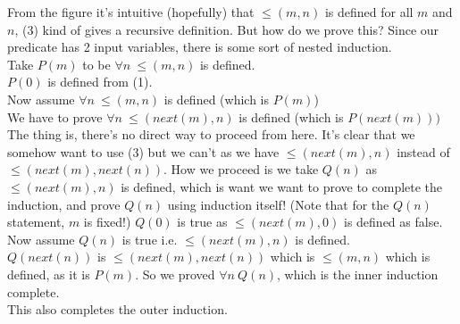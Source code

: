 \documentclass[a4paper,10pt]{article}
\theoremstyle{definition} %
\begin{document}
    From the figure it's intuitive (hopefully) that $\leq(m,n)$ is defined for all $m$ and $n$,
    (3) kind of gives a recursive definition. 
    But how do we prove this? Since our predicate has 2 input variables, there
    is some sort of nested induction.\\
    Take $P(m)$ to be $\forall n \ \leq(m,n)$ is defined. \\
    $P(0)$ is defined from (1).\\
    Now assume $\forall n \ \leq(m,n)$ is defined (which is $P(m)$) \\
    We have to prove $\forall n \ \leq(next(m),n)$ is defined (which is $P(next(m)))$ \\
    The thing is, there's no direct way to proceed from here. It's clear that we somehow
    want to use (3) but we can't as we have $\leq(next(m),n)$ instead of $\leq(next(m),next(n))$.
    How we proceed is we take $Q(n)$ as $\leq(next(m),n)$ is defined, which is want we want to prove
    to complete the induction, and prove $Q(n)$ using induction itself!
    (Note that for the $Q(n)$ statement, $m$ is fixed!)
    $Q(0)$ is true as $\leq (next(m), 0)$ is defined as false. \\
    Now assume $Q(n)$ is true i.e. $\leq(next(m),n)$ is defined. \\
    $Q(next(n))$ is $\leq(next(m),next(n))$ which is $\leq(m,n)$ which is defined, as it is $P(m)$.
    So we proved $\forall n \ Q(n)$, which is the inner induction complete. \\
    This also completes the outer induction.
\end{document}
